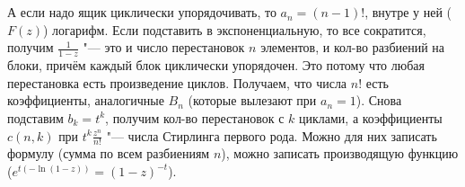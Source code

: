 \section{} %
	А если надо ящик циклически упорядочивать, то $a_n=(n-1)!$, внутре у ней ($F(z)$) логарифм.
	Если подставить в экспоненциальную, то все сократится, получим $\frac{1}{1-z}$ "---
	это и число перестановок $n$ элементов, и кол-во разбиений на блоки, причём каждый блок циклически упорядочен.
	Это потому что любая перестановка есть произведение циклов.
	Получаем, что числа $n!$ есть коэффициенты, аналогичные $B_n$ (которые вылезают при $a_n=1$).
	Снова подставим $b_k=t^k$, получим кол-во перестановок с $k$ циклами,
	а коэффициенты $c(n,k)$ при $t^k\frac{z^n}{n!}$ "--- числа Стирлинга первого рода.
	Можно для них записать формулу (сумма по всем разбиениям $n$),
	можно записать производящую функцию ($e^{t(-\ln(1-z))}=(1-z)^{-t}$).
	\TODO
